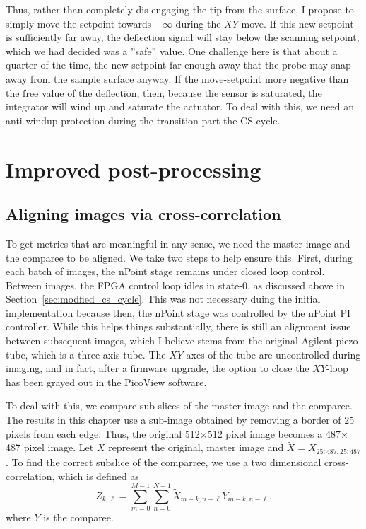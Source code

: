 \documentclass[11pt]{article}
\begin{document}
Thus, rather than completely dis-engaging the tip from the surface, I propose to simply move the setpoint towards $-\infty$ during the $XY$-move. If this new setpoint is sufficiently far away, the deflection signal will stay below the scanning setpoint, which we had decided was a ''safe'' value. One challenge here is that about a quarter of the time, the new setpoint far enough away that the probe may snap away from the sample surface anyway. If the move-setpoint more negative than the free value of the deflection, then, because the sensor is saturated, the integrator will wind up and saturate the actuator. To deal with this, we need an anti-windup protection during the transition part the CS cycle.


\section{Improved post-processing}
\subsection{Aligning images via cross-correlation}
To get metrics that are meaningful in any sense, we need the master image and the comparee to be aligned.
We take two steps to help ensure this.
First, during each batch of images, the nPoint stage remains under closed loop control.
Between images, the FPGA control loop idles in state-0, as discussed above in Section~\ref{sec:modfied_cs_cycle}.
This was not necessary duing the initial implementation because then, the nPoint stage was controlled by the nPoint PI controller.
While this helps things substantially, there is still an alignment issue between subsequent images, which I believe stems from the original Agilent piezo tube, which is a three axis tube.
The $XY$-axes of the tube are uncontrolled during imaging, and in fact, after a firmware upgrade, the option to close the $XY$-loop has been grayed out in the PicoView software.

To deal with this, we compare sub-slices of the master image and the comparee. The results in this chapter use a sub-image obtained by removing a border of 25 pixels from each edge. Thus, the original 512$\times$512 pixel image becomes a 487$\times$487 pixel image. Let $X$ represent the original, master image and
${\tilde X=X_{25:487, 25:487}}$. To find the correct subslice of the comparree, we use a two dimensional cross-correlation, which is defined as
\begin{equation}
  Z_{k,\ell} = \sum_{m=0}^{M-1}\sum_{n=0}^{N-1} \tilde{X}_{m-k, n-\ell}Y_{m-k, n-\ell}.
\end{equation}
where $Y$ is the comparee.
\end{document}
